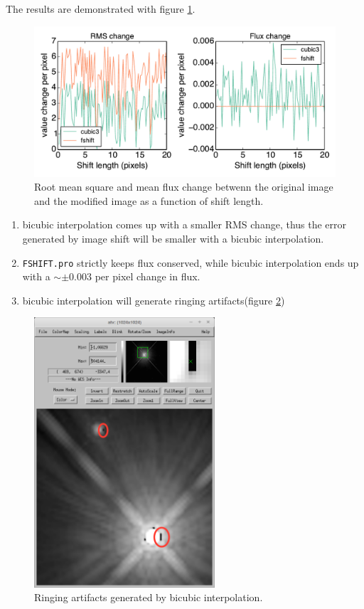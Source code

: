 \documentclass[paper=letter, fontsize=11pt]{scrartcl} %
\numberwithin{equation}{section} %
\numberwithin{figure}{section} %
\numberwithin{table}{section} %
\begin{document}
The results are demonstrated with figure \ref{fig:shifted}.
\begin{figure}[h]
  \centering
  \includegraphics[width=\textwidth]{test_shift}
  \caption{Root mean square and mean flux change betwenn the original image and the modified image as a function of shift length.}
  \label{fig:shifted}
\end{figure}
\begin{enumerate}
\item bicubic interpolation comes up with a smaller RMS change, thus
  the error generated by image shift will be smaller with a bicubic interpolation.
\item \texttt{FSHIFT.pro} strictly keeps flux conserved, while bicubic
  interpolation ends up with a $\sim \pm 0.003$ per pixel change in flux.
\item bicubic interpolation will generate ringing artifacts(figure \ref{fig:ringing})
\end{enumerate}
\begin{figure}[h]
  \centering
  \includegraphics[width=0.6\textwidth]{interpolated}
  \caption{Ringing artifacts generated by bicubic interpolation.}
  \label{fig:ringing}
\end{figure}
\end{document}
